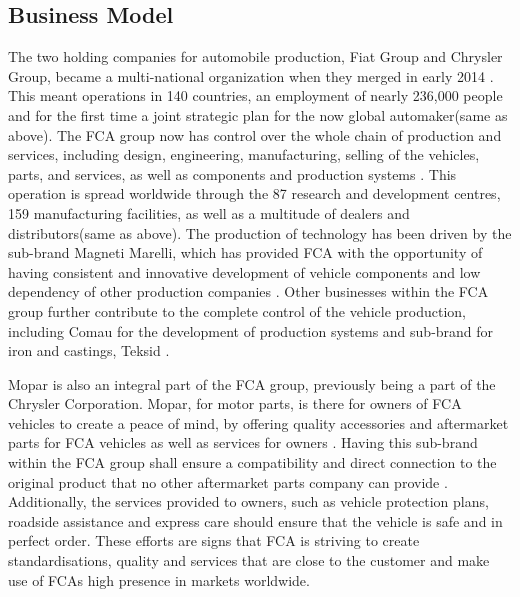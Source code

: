 \subsection{Business Model}
The two holding companies for automobile production, Fiat Group and Chrysler Group, became a multi-national organization when they merged in early 2014 \cite{fca_history}. This meant operations in 140 countries, an employment of nearly 236,000 people and for the first time a joint strategic plan for the now global automaker(same as above). The FCA group now has control over the whole chain of production and services, including design, engineering, manufacturing, selling of the vehicles, parts, and services, as well as components and production systems \cite{fca_overview}. This operation is spread worldwide through the 87 research and development centres, 159 manufacturing facilities, as well as a multitude of dealers and distributors(same as above). The production of technology has been driven by the sub-brand Magneti Marelli, which has provided FCA with the opportunity of having consistent and innovative development of vehicle components and low dependency of other production companies \cite{magneti_marelli}. Other businesses within the FCA group further contribute to the complete control of the vehicle production, including Comau for the development of production systems and sub-brand for iron and castings, Teksid \cite{fca_overview}.\n 

Mopar is also an integral part of the FCA group, previously being a part of the Chrysler Corporation. Mopar, for motor parts, is there for owners of FCA vehicles to create a peace of mind, by offering quality accessories and aftermarket parts for FCA vehicles as well as services for owners \cite{fca_mopar}. Having this sub-brand within the FCA group shall ensure a compatibility and direct connection to the original product that no other aftermarket parts company can provide \cite{fca_mopar}. Additionally, the services provided to owners, such as vehicle protection plans, roadside assistance and express care should ensure that the vehicle is safe and in perfect order. These efforts are signs that FCA is striving to create standardisations, quality and services that are close to the customer and make use of FCAs high presence in markets worldwide. 
 
